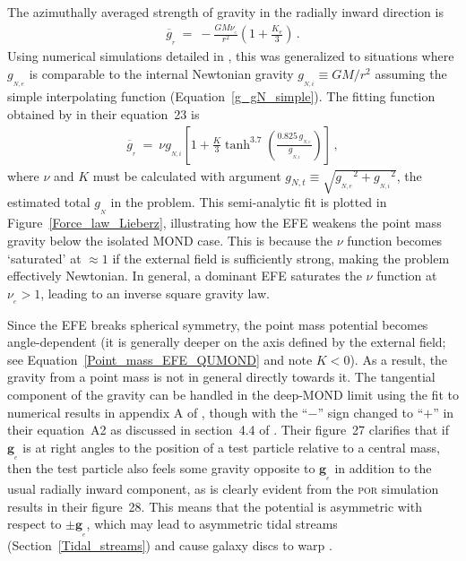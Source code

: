 \documentclass[fleqn,usenatbib,useAMS]{mnras} %
\begin{document}
The azimuthally averaged strength of gravity in the radially inward direction is
\begin{eqnarray}
	\overline{g}_{_r} ~=~ -\frac{GM\nu_{_e}}{r^2} \left( 1 + \frac{K_e}{3} \right) \, .
	\label{Angle_averaged_force_EFE_domination}
\end{eqnarray}
Using numerical simulations detailed in \citet{Banik_2018_Centauri}, this was generalized to situations where $g_{_{N,e}}$ is comparable to the internal Newtonian gravity $g_{_{N,i}} \equiv GM/r^2$ assuming the simple interpolating function (Equation~\ref{g_gN_simple}). The fitting function obtained by \citet{Zonoozi_2021} in their equation~23 is
\begin{eqnarray}
	\overline{g}_{_r} ~=~ \nu g_{_{N,i}} \left[ 1 + \frac{K}{3}\tanh^{3.7} \left( \frac{0.825 \, g_{_{N,e}}}{g_{_{N,i}}} \right) \right] \, ,
	\label{Lieberz_fit}
\end{eqnarray}
where $\nu$ and $K$ must be calculated with argument $g_{N,t} \equiv \sqrt{{g_{_{N,e}}}^2 + {g_{_{N,i}}}^2}$, the estimated total $g_{_N}$ in the problem. This semi-analytic fit is plotted in Figure~\ref{Force_law_Lieberz}, illustrating how the EFE weakens the point mass gravity below the isolated MOND case. This is because the $\nu$ function becomes `saturated' at $\approx 1$ if the external field is sufficiently strong, making the problem effectively Newtonian. In general, a dominant EFE saturates the $\nu$ function at $\nu_{_e} > 1$, leading to an inverse square gravity law.

Since the EFE breaks spherical symmetry, the point mass potential becomes angle-dependent (it is generally deeper on the axis defined by the external field; see Equation~\ref{Point_mass_EFE_QUMOND} and note $K < 0$). As a result, the gravity from a point mass is not in general directly towards it. The tangential component of the gravity can be handled in the deep-MOND limit using the fit to numerical results in appendix A of \citet{Banik_Ryan_2018}, though with the ``$-$'' sign changed to ``$+$'' in their equation~A2 as discussed in section~4.4 of \citet{Banik_2020_M33}. Their figure~27 clarifies that if $\bm{g}_{_e}$ is at right angles to the position of a test particle relative to a central mass, then the test particle also feels some gravity opposite to $\bm{g}_{_e}$ in addition to the usual radially inward component, as is clearly evident from the \textsc{por} simulation results in their figure~28. This means that the potential is asymmetric with respect to $\pm \bm{g}_{_e}$, which may lead to asymmetric tidal streams (Section~\ref{Tidal_streams}) and cause galaxy discs to warp \citep{Brada_2000_warp, Banik_2020_M33}.
\end{document}
